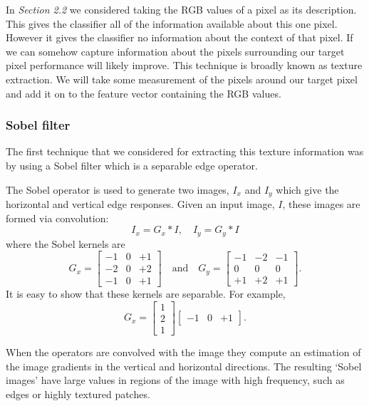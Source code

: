 \documentclass[12pt]{IIBproject}
\begin{document}
In \emph{Section 2.2} we considered taking the RGB values of a pixel as its description. This gives the classifier all of the information available about this one pixel. However it gives the classifier no information about the context of that pixel. If we can somehow capture information about the pixels surrounding our target pixel performance will likely improve. This technique is broadly known as texture extraction. We will take some measurement of the pixels around our target pixel and add it on to the feature vector containing the RGB values.

\subsubsection{Sobel filter}

 The first technique that we considered for extracting this texture information was by using a Sobel filter \cite{farid1997optimally} which is a separable edge operator. 
 
The Sobel operator is used to generate two images, $I_x$ and $I_y$ which give
the horizontal and vertical edge responses. Given an input image, $I$, these
images are formed via convolution:
\begin{equation}
I_x = G_x * I, \quad
I_y = G_y * I
\end{equation}
where the Sobel kernels are
\begin{equation}
G_x = \begin{bmatrix}
 -1 & 0 & +1  \\
-2 & 0 & +2 \\
-1 & 0 & +1
\end{bmatrix}
\quad
\mbox{and}
\quad
G_y = \begin{bmatrix}
-1 & -2 & -1 \\
 0 & 0 & 0 \\
+1 & +2 & +1
\end{bmatrix}.
\end{equation}
It is easy to show that these kernels are separable. For example,
\begin{equation}
G_x =
\begin{bmatrix}
 1 \\ 2 \\ 1
\end{bmatrix}
\begin{bmatrix}
-1 & 0 & +1
\end{bmatrix}.
\end{equation}

 
 When the operators are convolved with the image they compute an estimation of the image gradients in the vertical and horizontal directions. The resulting `Sobel images' have large values in regions of the image with high frequency, such as edges or highly textured patches.
 \newpage
 
\end{document}
